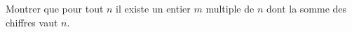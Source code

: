 Montrer que pour tout $n$ il existe un entier $m$ multiple de $n$ dont la somme des chiffres vaut $n$.